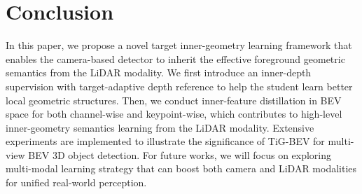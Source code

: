 \documentclass[10pt,twocolumn,letterpaper]{article}
\begin{document}




\section{Conclusion}
In this paper, we propose a novel target inner-geometry learning framework that enables the camera-based detector to inherit the effective foreground geometric semantics from the LiDAR modality. We first introduce an inner-depth supervision with target-adaptive depth reference to help the student learn better local geometric structures. Then, we conduct inner-feature distillation in BEV space for both channel-wise and keypoint-wise, which contributes to high-level inner-geometry semantics learning from the LiDAR modality. Extensive experiments are implemented to illustrate the significance of TiG-BEV for multi-view BEV 3D object detection. For future works, we will focus on exploring multi-modal learning strategy that can boost both camera and LiDAR modalities for unified real-world perception.

\end{document}
